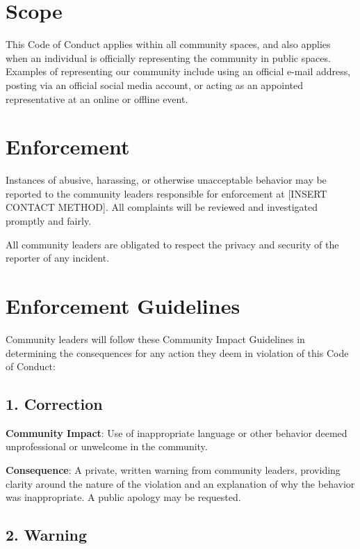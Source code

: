 \documentclass[
  fontsize=13pt,
  english,
  a4paper,
  openany, a4paper, oneside]{book}
\begin{document}
\hypertarget{scope}{%
\section{Scope}\label{scope}}

This Code of Conduct applies within all community spaces, and also applies when
an individual is officially representing the community in public spaces.
Examples of representing our community include using an official e-mail address,
posting via an official social media account, or acting as an appointed
representative at an online or offline event.

\hypertarget{enforcement}{%
\section{Enforcement}\label{enforcement}}

Instances of abusive, harassing, or otherwise unacceptable behavior may be
reported to the community leaders responsible for enforcement at
{[}INSERT CONTACT METHOD{]}.
All complaints will be reviewed and investigated promptly and fairly.

All community leaders are obligated to respect the privacy and security of the
reporter of any incident.

\hypertarget{enforcement-guidelines}{%
\section{Enforcement Guidelines}\label{enforcement-guidelines}}

Community leaders will follow these Community Impact Guidelines in determining
the consequences for any action they deem in violation of this Code of Conduct:

\hypertarget{correction}{%
\subsection{1. Correction}\label{correction}}

\textbf{Community Impact}: Use of inappropriate language or other behavior deemed
unprofessional or unwelcome in the community.

\textbf{Consequence}: A private, written warning from community leaders, providing
clarity around the nature of the violation and an explanation of why the
behavior was inappropriate. A public apology may be requested.

\hypertarget{warning}{%
\subsection{2. Warning}\label{warning}}
\end{document}
